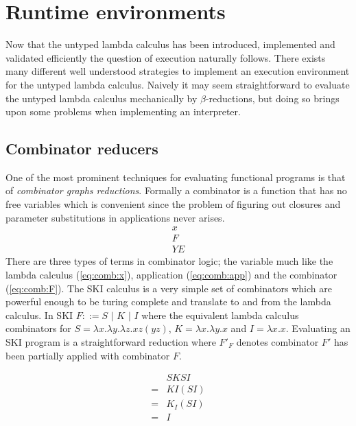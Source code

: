 \documentclass[11pt,oneside,a4paper]{report}
\begin{document}
\section{Runtime environments}
Now that the untyped lambda calculus has been introduced, implemented and validated efficiently the question of execution naturally follows.
There exists many different well understood strategies to implement an execution environment for the untyped lambda calculus.
Naively it may seem straightforward to evaluate the untyped lambda calculus mechanically by $\beta$-reductions, but doing so brings upon some problems when implementing an interpreter.

\subsection{Combinator reducers}
\label{sec:comb}
One of the most prominent techniques for evaluating functional programs is that of \textit{combinator graphs reductions}.
Formally a combinator is a function that has no free variables which is convenient since the problem of figuring out closures and parameter substitutions in applications never arises.
\begin{align}
    x \label{eq:comb:x}\\
    F \label{eq:comb:F}\\
    Y E \label{eq:comb:app}
\end{align}
There are three types of terms in combinator logic; the variable much like the lambda calculus (\autoref{eq:comb:x}), application (\autoref{eq:comb:app}) and the combinator (\autoref{eq:comb:F}).
The SKI calculus is a very simple set of combinators which are powerful enough to be turing complete and translate to and from the lambda calculus.
In SKI $F ::= S \,\,|\,\, K \,\,|\,\, I$ where the equivalent lambda calculus combinators for $S = \lambda x . \lambda y . \lambda z . x z (y z)$, $K = \lambda x . \lambda y . x$ and $I = \lambda x . x$.
Evaluating an SKI program is a straightforward reduction where $F'_F$ denotes combinator $F'$ has been partially applied with combinator $F$.
\begin{exmp}
    \begin{align}
        &SKSI\\
        = &KI(SI)\tag*{}\\
        = &K_I(SI)\tag*{}\\
        = &I\tag*{}
    \end{align}
\end{exmp}
\end{document}
